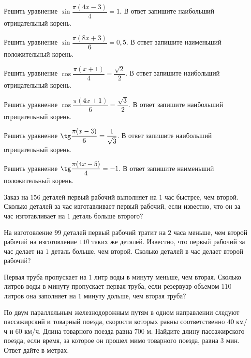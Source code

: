 \begin{homework}[number=2]
	\begin{listofex}
		\item Решить уравнение \( \sin\dfrac{\pi(4x-3)}{4}=1 \). В ответ запишите наибольший отрицательный корень.
		\item Решить уравнение \( \sin\dfrac{\pi(8x+3)}{6}=0,5 \). В ответ запишите наименьший положительный корень.
		\item Решить уравнение \( \cos\dfrac{\pi(x+1)}{4}=\dfrac{\sqrt{2}}{2} \). В ответ запишите наибольший отрицательный корень.
		\item Решить уравнение \( \cos\dfrac{\pi(4x+1)}{6}=\dfrac{\sqrt{3}}{2} \). В ответ запишите наибольший отрицательный корень.
		\item Решить уравнение \( \tg\dfrac{\pi(x-3)}{6}=\dfrac{1}{\sqrt{3}} \). В ответ запишите наибольший отрицательный корень.
		\item Решить уравнение \( \tg\dfrac{\pi(4x-5)}{4}=-1 \). В ответ запишите наименьший положительный корень.
		\item Заказ на \(156\) деталей первый рабочий выполняет на \(1\) час быстрее, чем второй. Сколько деталей за час изготавливает первый рабочий, если известно, что он за час изготавливает на \(1\) деталь больше второго?
		\item На изготовление \(99\) деталей первый рабочий тратит на \(2\) часа меньше, чем второй рабочий на изготовление \(110\) таких же деталей. Известно, что первый рабочий за час делает на \(1\) деталь больше, чем второй. Сколько деталей в час делает второй рабочий?
		\item Первая труба пропускает на \(1\) литр воды в минуту меньше, чем вторая. Сколько литров воды в минуту пропускает первая труба, если резервуар объемом \(110\) литров она заполняет на \(1\) минуту дольше, чем вторая труба?
		\item По двум параллельным железнодорожным путям в одном направлении следуют пассажирский и товарный поезда, скорости которых равны соответственно \(40\) км/ч и \(60\) км/ч. Длина товарного поезда равна \(700\) м. Найдите длину пассажирского поезда, если время, за которое он прошел мимо товарного поезда, равна \(3\) мин. Ответ дайте в метрах.
	\end{listofex}
\end{homework}

